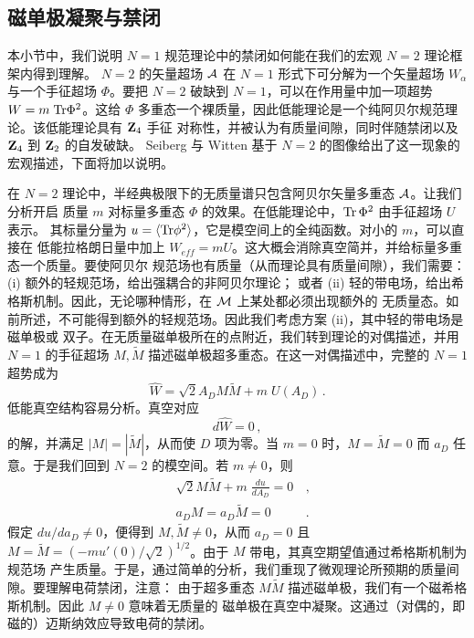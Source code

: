 \subsection{磁单极凝聚与禁闭}

本小节中，我们说明 $N = 1$ 规范理论中的禁闭如何能在我们的宏观 $N=2$ 理论框架内得到理解。
$N = 2$ 的矢量超场 ${\cal A}$ 在 $N=1$ 形式下可分解为一个矢量超场 $W_{\alpha}$ 与一个手征超场
$\Phi$。要把 $N = 2$ 破缺到 $N = 1$，可以在作用量中加一项超势 $W=m\; {\rm Tr}\Phi^2$。这给
$\Phi$ 多重态一个裸质量，因此低能理论是一个纯阿贝尔规范理论。该低能理论具有 ${\bf Z}_{4}$ 手征
对称性，并被认为有质量间隙，同时伴随禁闭以及 ${\bf Z}_4$ 到 ${\bf Z}_2$ 的自发破缺。
Seiberg 与 Witten 基于 $N=2$ 的图像给出了这一现象的宏观描述，下面将加以说明。


在 $N=2$ 理论中，半经典极限下的无质量谱只包含阿贝尔矢量多重态 ${\cal A}$。让我们分析开启
质量 $m$ 对标量多重态 $\Phi$ 的效果。在低能理论中，${\rm Tr}\,\Phi^2$ 由手征超场 $U$ 表示。
其标量分量为 $u =\langle{\rm Tr}\phi^2\rangle$，它是模空间上的全纯函数。对小的 $m$，可以直接在
低能拉格朗日量中加上 $W_{eff} = mU$。这大概会消除真空简并，并给标量多重态一个质量。要使阿贝尔
规范场也有质量（从而理论具有质量间隙），我们需要：(i) 额外的轻规范场，给出强耦合的非阿贝尔理论；
或者 (ii) 轻的带电场，给出希格斯机制。因此，无论哪种情形，在 ${\cal M}$ 上某处都必须出现额外的
无质量态。如前所述，不可能得到额外的轻规范场。因此我们考虑方案 (ii)，其中轻的带电场是磁单极或
双子。在无质量磁单极所在的点附近，我们转到理论的对偶描述，并用 $N=1$ 的手征超场
$M, \widetilde M$ 描述磁单极超多重态。在这一对偶描述中，完整的 $N=1$ 超势成为
$$
\hat{W} = \sqrt{2} A_{D} M \widetilde M + m \; U(A_{D})\,.
$$
低能真空结构容易分析。真空对应
$$
d \hat{W} = 0\,,
$$
的解，并满足 $|M| = |\widetilde M|$，从而使 $D$ 项为零。当 $m=0$ 时，$M=\widetilde M =0$ 而
$a_{D}$ 任意。于是我们回到 $N=2$ 的模空间。若 $m \not= 0$，则
\begin{eqnarray}
&{\displaystyle
\sqrt{2} M \widetilde M + m \; \frac{du}{dA_{D}} = 0} &\,,\nonumber \\
& a_{D}M = a_{D}\widetilde M = 0 &\,.\nonumber 
\end{eqnarray}
假定 $du/da_{D} \not= 0$，便得到 $M, \widetilde M\not= 0$，从而 $a_D=0$ 且
$M=\widetilde M=(-m u'(0)/\sqrt{2})^{1/2}$。由于 $M$ 带电，其真空期望值通过希格斯机制为规范场
产生质量。于是，通过简单的分析，我们重现了微观理论所预期的质量间隙。要理解电荷禁闭，注意：
由于超多重态 $M\widetilde M$ 描述磁单极，我们有一个磁希格斯机制。因此 $M\ne 0$ 意味着无质量的
磁单极在真空中凝聚。这通过（对偶的，即磁的）迈斯纳效应导致电荷的禁闭。


